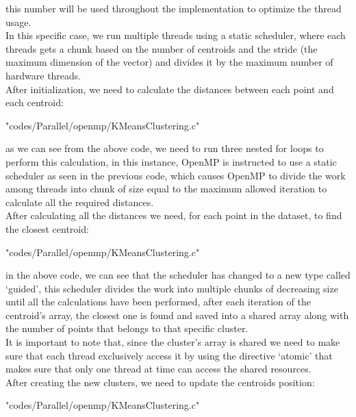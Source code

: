\documentclass[10pt,twocolumn,letterpaper]{article}
\begin{document}
this number will be used throughout the implementation to optimize the thread usage.\\
In this specific case, we run multiple threads using a static scheduler, where each threads gets a chunk based on the number of 
centroids and the stride (the maximum dimension of the vector) and divides it by the maximum number of hardware threads.\\
After initialization, we need to calculate the distances between each point and each centroid:\\

\begin{lstinputlisting}[language=C,style=CSnippetStyle,caption=OpenMP Distance Calculation,firstline=29,lastline=41]
					   {"codes/Parallel/openmp/KMeansClustering.c"}
\end{lstinputlisting}
as we can see from the above code, we need to run three nested for loops to perform this calculation, in this instance, OpenMP 
is instructed to use a static scheduler as seen in the previous code, which causes OpenMP to divide the work among threads into
chunk of size equal to the maximum allowed iteration to calculate all the required distances.\\
After calculating all the distances we need, for each point in the dataset, to find the closest centroid:\\
\begin{lstinputlisting}[language=C,style=CSnippetStyle,caption=OpenMP Nearest Centroid Calculation,firstline=45,lastline=61]
					   {"codes/Parallel/openmp/KMeansClustering.c"}
\end{lstinputlisting}
in the above code, we can see that the scheduler has changed to a new type called `guided', this scheduler divides the work 
into multiple chunks of decreasing size until all the calculations have been performed, after each iteration of the centroid's
array, the closest one is found and saved into a shared array along with the number of points that belongs to that specific 
cluster.\\
It is important to note that, since the cluster's array is shared we need to make sure that each thread exclusively access it 
by using the directive `atomic' that makes sure that only one thread at time can access the shared resources.\\
After creating the new clusters, we need to update the centroids position:\\
\begin{lstinputlisting}[language=C,style=CSnippetStyle,caption=OpenMP Mean Calculation I,firstline=63,lastline=72]
					   {"codes/Parallel/openmp/KMeansClustering.c"}
\end{lstinputlisting}
\end{document}
